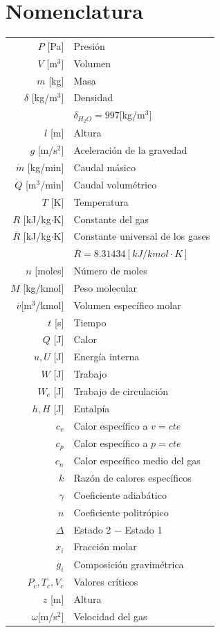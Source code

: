 \documentclass[11pt,a4paper,twocolumn]{article}
\begin{document}
	

	
\pagestyle{fancy}
\vspace{1cm}
	\section*{Nomenclatura} \vspace{-.3cm}
	\begin{tabular}{r l}
		$P$ [Pa] & Presión\\
		$V$ [m$^{3}$] & Volumen \\
		$m$ [kg] & Masa \\
		$\delta$ [kg/m$^{3}$] & Densidad \\
		& $\delta_{H_{2}O}=997$[kg/m$^{3}$] \\
		$l$ [m] & Altura \\ 
		$g$ [m/s$^{2}$] & Aceleración de la gravedad \\
		$\dot{m}$ [kg/min] & Caudal másico \\
		$\dot{Q}$ [m$^3$/min]& Caudal volumétrico\\
		$T$ [K] & Temperatura \\
		$R$ [kJ/kg$\cdot$K] & Constante del gas \\
		$\overline{R}$ [kJ/kg$\cdot$K] & Constante universal de los gases \\
		& $\overline{R}=8.31434 [kJ/kmol\cdot K]$ \\
		$n$ [moles] & Número de moles \\
		$M$ [kg/kmol] & Peso molecular \\ 
		$\overline{v}$[m$^3$/kmol] & Volumen específico molar \\
		$t$ [s] & Tiempo \\
		$Q$ [J] & Calor \\
		$u,U$ [J] & Energía interna\\
		$W$ [J] & Trabajo \\
		$W_{c}$ [J] & Trabajo de circulación\\
		$h, H$ [J]& Entalpía \\
		$c_{v}$ & Calor específico a $v=cte$ \\
		$c_{p}$ & Calor específico a $p=cte$ \\
		$c_{n}$ & Calor específico medio del gas \\
		$k$ & Razón de calores específicos \\
		$\gamma$ & Coeficiente adiabático \\
		$n$ & Coeficiente politrópico \\
		$\Delta$ & Estado 2 $-$ Estado 1 \\
		$x_{i}$ & Fracción molar \\
		$g_{i}$ & Composición gravimétrica \\
		$P_{c}, T_{c}, V_{c}$ & Valores críticos \\
		$z$ [m] & Altura \\
		$\omega$[m/s$^{2}$] & Velocidad del gas\\

		
	\end{tabular}
\newpage
\end{document}
